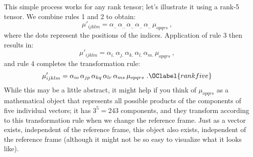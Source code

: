 This simple process works for any rank tensor; let's illustrate it using a rank-5 tensor.  We combine rules 1 and 2 to obtain:
\[
	\mu'_{ijklm} = \alpha_{..}\,\alpha_{..}\,\alpha_{..}\,\alpha_{..}\,\alpha_{..}\, \mu_{opqrs}\ ,
\]
where the dots represent the positions of the indices. Application of rule 3 then results in:
\[
	\mu'_{ijklm} = \alpha_{i.}\,\alpha_{j.}\,\alpha_{k.}\,\alpha_{l.}\,\alpha_{m.}\, \mu_{opqrs}\ ,
\]
and rule 4 completes the transformation rule:
\begin{equation}
	\mu'_{ijklm} = \alpha_{io}\,\alpha_{jp}\,\alpha_{kq}\,\alpha_{lr}\,\alpha_{ms}\, \mu_{opqrs}\ .\OClabel{rankfive}
\end{equation}
While this may be a little abstract, it might help if you think of $\mu_{opqrs}$ as a mathematical object that represents all possible products of the components of five individual vectors; it has $3^5=243$ components, and they transform according to this transformation rule when we change the reference frame. Just as a vector exists, independent of the reference frame, this object also exists, independent of the reference frame (although it might not be so easy to visualize what it looks like).  

